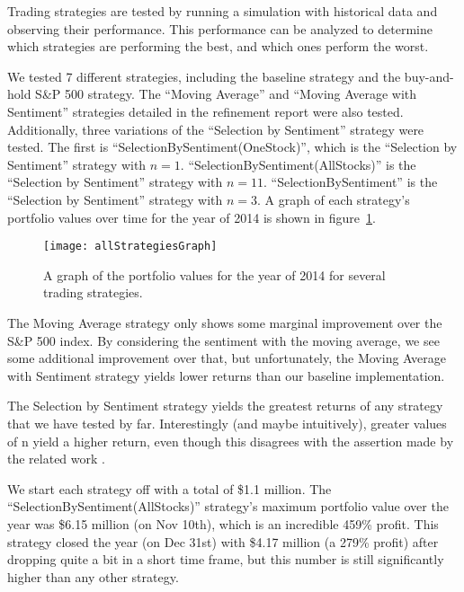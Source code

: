 Trading strategies are tested by running a simulation with historical data and observing their performance.
This performance can be analyzed to determine which strategies are performing the best, and which ones perform the worst.

We tested 7 different strategies, including the baseline strategy and the buy-and-hold S\&P 500 strategy.
The ``Moving Average'' and ``Moving Average with Sentiment'' strategies detailed in the refinement report were also tested.
Additionally, three variations of the ``Selection by Sentiment'' strategy were tested.
The first is ``SelectionBySentiment(OneStock)'', which is the ``Selection by Sentiment'' strategy with $n=1$.
``SelectionBySentiment(AllStocks)'' is the ``Selection by Sentiment'' strategy with $n=11$.
``SelectionBySentiment'' is the ``Selection by Sentiment'' strategy with $n=3$.
A graph of each strategy's portfolio values over time for the year of 2014 is shown in figure~\ref{allStrategiesGraph}.

\begin{figure}[h]
  \label{allStrategiesGraph}
  \begin{center}
    \texttt{[image: allStrategiesGraph]}
  \end{center}
  \caption{A graph of the portfolio values for the year of 2014 for several trading strategies.}
\end{figure}

The Moving Average strategy only shows some marginal improvement over the S\&P 500 index.
By considering the sentiment with the moving average, we see some additional improvement over that, but unfortunately, the Moving Average with Sentiment strategy yields lower returns than our baseline implementation.

The Selection by Sentiment strategy yields the greatest returns of any strategy that we have tested by far.
Interestingly (and maybe intuitively), greater values of  n  yield a higher return, even though this disagrees with the assertion made by the related work \cite{tradingSentimentPaper}.

We start each strategy off with a total of \$1.1 million.
The ``SelectionBySentiment(AllStocks)'' strategy’s maximum portfolio value over the year was \$6.15 million (on Nov 10th), which is an incredible 459\% profit.
This strategy closed the year (on Dec 31st) with \$4.17 million (a 279\% profit) after dropping quite a bit in a short time frame, but this number is still significantly higher than any other strategy.

